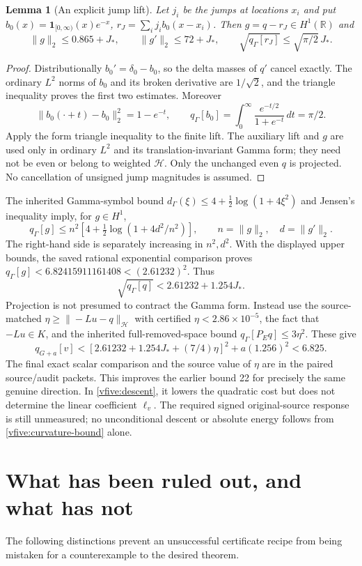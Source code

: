 \documentclass[11pt,a4paper]{article}
\numberwithin{equation}{section}
\newtheorem{lemma}[theorem]{Lemma}
\theoremstyle{definition}\newtheorem{definition}[theorem]{Definition}
\theoremstyle{remark}\newtheorem{remark}[theorem]{Remark}
\newcommand{\R}{\mathbb R}\newcommand{\C}{\mathbb C}\newcommand{\N}{\mathbb N}
\newcommand{\Hh}{\mathcal H}\newcommand{\Hw}{\mathcal H}
\begin{document}
\begin{lemma}[An explicit jump lift]
Let $j_i$ be the jumps at locations $x_i$ and put $b_0(x)=\mathbf1_{[0,\infty)}(x)e^{-x}$, $r_J=\sum_i j_i b_0(x-x_i)$. Then $g=q-r_J\in H^1(\R)$ and
\[
 \|g\|_2\leq0.865+J_*,\qquad\|g'\|_2\leq72+J_*,
 \qquad\sqrt{q_\Gamma[r_J]}\leq\sqrt{\pi/2}\,J_*.
\]
\end{lemma}
\begin{proof}
Distributionally $b_0'=\delta_0-b_0$, so the delta masses of $q'$ cancel exactly. The ordinary $L^2$ norms of $b_0$ and its broken derivative are $1/\sqrt2$, and the triangle inequality proves the first two estimates. Moreover
\[
 \|b_0(\cdot+t)-b_0\|_2^2=1-e^{-t},\qquad
 q_\Gamma[b_0]=\int_0^\infty\frac{e^{-t/2}}{1+e^{-t}}\,dt=\pi/2.
\]
Apply the form triangle inequality to the finite lift. The auxiliary lift and $g$ are used only in ordinary $L^2$ and its translation-invariant Gamma form; they need not be even or belong to weighted $\Hh$. Only the unchanged even $q$ is projected. No cancellation of unsigned jump magnitudes is assumed.
\end{proof}

The inherited Gamma-symbol bound $d_\Gamma(\xi)\leq4+\frac12\log(1+4\xi^2)$ and Jensen's inequality imply, for $g\in H^1$,
\[
 q_\Gamma[g]\leq n^2\left[4+\tfrac12\log(1+4d^2/n^2)\right],
 \qquad n=\|g\|_2,\quad d=\|g'\|_2.
\]
The right-hand side is separately increasing in $n^2,d^2$. With the displayed upper bounds, the saved rational exponential comparison proves $q_\Gamma[g]<6.82415911161408<(2.61232)^2$. Thus
\[
 \sqrt{q_\Gamma[q]}<2.61232+1.254J_*.
\]
Projection is not presumed to contract the Gamma form. Instead use the source-matched $\eta\geq\|-Lu-q\|_{\Hh}$ with certified $\eta<2.86\times10^{-5}$, the fact that $-Lu\in K$, and the inherited full-removed-space bound $q_\Gamma[P_Eq]\leq3\eta^2$. These give
\begin{equation}\label{vfive:curvature-bound}
 q_{G+a}[v]<[2.61232+1.254J_*+(7/4)\eta]^2+a(1.256)^2<6.825.
\end{equation}
The final exact scalar comparison and the source value of $\eta$ are in the paired source/audit packets. This improves the earlier bound 22 for precisely the same genuine direction. In \eqref{vfive:descent}, it lowers the quadratic cost but does not determine the linear coefficient $\ell_v$. The required signed original-source response is still unmeasured; no unconditional descent or absolute energy follows from \eqref{vfive:curvature-bound} alone.

\section{What has been ruled out, and what has not}\label{vfive:obstacles}
The following distinctions prevent an unsuccessful certificate recipe from being mistaken for a counterexample to the desired theorem.
\end{document}
